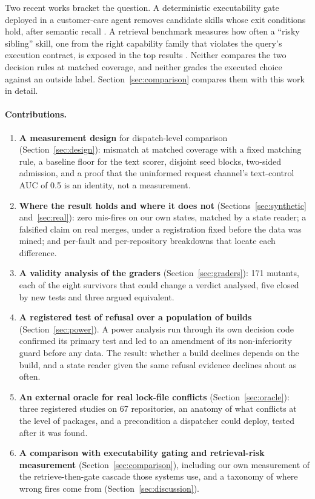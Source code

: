 \documentclass[11pt]{article}
\begin{document}
Two recent works bracket the question. A deterministic executability gate deployed in a
customer-care agent removes candidate skills whose exit conditions hold, after semantic recall
\cite{wix2026gating}. A retrieval benchmark measures how often a ``risky sibling'' skill, one
from the right capability family that violates the query's execution contract, is exposed in the
top results \cite{ding2026rightfamily}. Neither compares the two decision rules at matched
coverage, and neither grades the executed choice against an outside label. Section~\ref{sec:comparison}
compares them with this work in detail.

\paragraph{Contributions.}
\begin{enumerate}
  \item \textbf{A measurement design} for dispatch-level comparison (Section~\ref{sec:design}):
  mismatch at matched coverage with a fixed matching rule, a baseline floor for the text
  scorer, disjoint seed blocks, two-sided admission, and a proof that the uninformed request
  channel's text-control AUC of 0.5 is an identity, not a measurement.
  \item \textbf{Where the result holds and where it does not} (Sections~\ref{sec:synthetic}
  and~\ref{sec:real}): zero mis-fires on our own states, matched by a state reader; a
  falsified claim on real merges, under a registration fixed before the data was mined; and
  per-fault and per-repository breakdowns that locate each difference.
  \item \textbf{A validity analysis of the graders} (Section~\ref{sec:graders}): 171 mutants,
  each of the eight survivors that could change a verdict analysed, five closed by new tests and
  three argued equivalent.
  \item \textbf{A registered test of refusal over a population of builds}
  (Section~\ref{sec:power}). A power analysis run through its own decision code confirmed its
  primary test and led to an amendment of its non-inferiority guard before any data. The result:
  whether a build declines depends on the build, and a state reader given the same refusal
  evidence declines about as often.
  \item \textbf{An external oracle for real lock-file conflicts} (Section~\ref{sec:oracle}): three
  registered studies on 67 repositories, an anatomy of what conflicts at the level of packages,
  and a precondition a dispatcher could deploy, tested after it was found.
  \item \textbf{A comparison with executability gating and retrieval-risk measurement}
  (Section~\ref{sec:comparison}), including our own measurement of the retrieve-then-gate
  cascade those systems use, and a taxonomy of where wrong fires come from
  (Section~\ref{sec:discussion}).
\end{enumerate}
\end{document}
